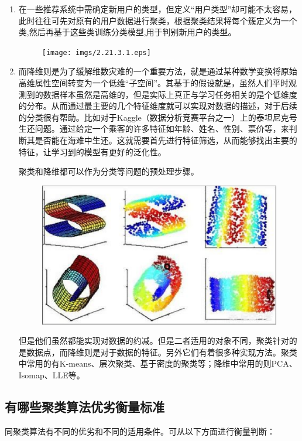 \begin{enumerate}\itemsep0em 
		\item 在一些推荐系统中需确定新用户的类型，但定义“用户类型”却可能不太容易，此时往往可先对原有的用户数据进行聚类，根据聚类结果将每个簇定义为一个类,然后再基于这些类训练分类模型,用于判别新用户的类型。

			\begin{figure}[h]
				\centering
				\texttt{[image: imgs/2.21.3.1.eps]}
			\end{figure}

		\item 而降维则是为了缓解维数灾难的一个重要方法，就是通过某种数学变换将原始高维属性空间转变为一个低维“子空间”。其基于的假设就是，虽然人们平时观测到的数据样本虽然是高维的，但是实际上真正与学习任务相关的是个低维度的分布。从而通过最主要的几个特征维度就可以实现对数据的描述，对于后续的分类很有帮助。比如对于Kaggle（数据分析竞赛平台之一）上的泰坦尼克号生还问题。通过给定一个乘客的许多特征如年龄、姓名、性别、票价等，来判断其是否能在海难中生还。这就需要首先进行特征筛选，从而能够找出主要的特征，让学习到的模型有更好的泛化性。

			聚类和降维都可以作为分类等问题的预处理步骤。

		\begin{figure}[h]
			\centering
			\includegraphics[width=.7\textwidth]{imgs/2-19.eps}
		\end{figure}

		但是他们虽然都能实现对数据的约减。但是二者适用的对象不同，聚类针对的是数据点，而降维则是对于数据的特征。另外它们有着很多种实现方法。聚类中常用的有K-means、层次聚类、基于密度的聚类等；降维中常用的则PCA、Isomap、LLE等。
\end{enumerate}


\subsection{有哪些聚类算法优劣衡量标准}

 同聚类算法有不同的优劣和不同的适用条件。可从以下方面进行衡量判断：

